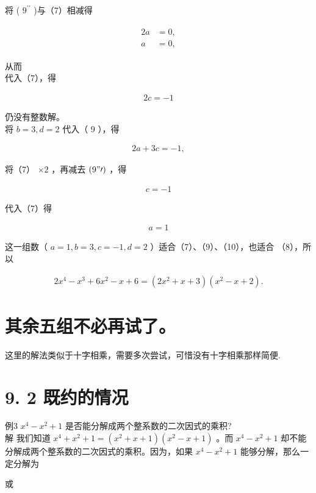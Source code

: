 \documentclass[10pt]{article}
\begin{document}
将 ( $9^{\prime \prime}$ )与（7）相减得

\begin{align*}
\begin{aligned}
2 a & =0, \\
a & =0,
\end{aligned}
\end{align*}

从而\\
代入（7），得

\begin{align*}
2 c=-1
\end{align*}

仍没有整数解。\\
将 $b=3, d=2$ 代入（ 9 ），得

\begin{align*}
2 a+3 c=-1,
\end{align*}

将（7） $\times 2$ ，再减去 $(9 " \prime)$ ，得

\begin{align*}
c=-1
\end{align*}

代入（7）得

\begin{align*}
a=1
\end{align*}

这一组数（ $a=1, b=3, c=-1, d=2$ ）适合（7）、（9）、（10），也适合 （8），所以

\begin{align*}
2 x^{4}-x^{3}+6 x^{2}-x+6=\left(2 x^{2}+x+3\right)\left(x^{2}-x+2\right) .
\end{align*}

\section*{其余五组不必再试了。}
这里的解法类似于十字相乘，需要多次尝试，可惜没有十字相乘那样简便.

\section*{9. 2 既约的情况}
例3 $x^{4}-x^{2}+1$ 是否能分解成两个整系数的二次因式的乘积?\\
解 我们知道 $x^{4}+x^{2}+1=\left(x^{2}+x+1\right)\left(x^{2}-x+1\right)$ 。而 $x^{4}-x^{2}+1$ 却不能分解成两个整系数的二次因式的乘积。因为，如果 $x^{4}-x^{2}+1$ 能够分解，那么一定分解为

或
\end{document}
